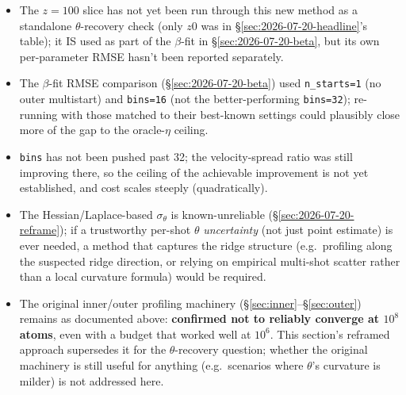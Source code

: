 \documentclass[11pt,a4paper]{article}
\newcommand{\code}[1]{\texttt{#1}}
\begin{document}
\begin{itemize}
\item The $z{=}100$ slice has not yet been run through this new method as
  a standalone $\theta$-recovery check (only $z0$ was in
  \S\ref{sec:2026-07-20-headline}'s table); it IS used as part of the
  $\beta$-fit in \S\ref{sec:2026-07-20-beta}, but its own per-parameter
  RMSE hasn't been reported separately.
\item The $\beta$-fit RMSE comparison (\S\ref{sec:2026-07-20-beta}) used
  \code{n\_starts=1} (no outer multistart) and \code{bins=16} (not the
  better-performing \code{bins=32}); re-running with those matched to their
  best-known settings could plausibly close more of the gap to the
  oracle-$\eta$ ceiling.
\item \code{bins} has not been pushed past 32; the velocity-spread ratio
  was still improving there, so the ceiling of the achievable improvement
  is not yet established, and cost scales steeply (quadratically).
\item The Hessian/Laplace-based $\sigma_\theta$ is known-unreliable
  (\S\ref{sec:2026-07-20-reframe}); if a trustworthy per-shot $\theta$
  \emph{uncertainty} (not just point estimate) is ever needed, a method
  that captures the ridge structure (e.g.\ profiling along the suspected
  ridge direction, or relying on empirical multi-shot scatter rather than
  a local curvature formula) would be required.
\item The original inner/outer profiling machinery
  (\S\ref{sec:inner}--\S\ref{sec:outer}) remains as documented above:
  \textbf{confirmed not to reliably converge at $10^8$ atoms}, even with a
  budget that worked well at $10^6$. This section's reframed approach
  supersedes it for the $\theta$-recovery question; whether the original
  machinery is still useful for anything (e.g.\ scenarios where $\theta$'s
  curvature is milder) is not addressed here.
\end{itemize}
\end{document}
